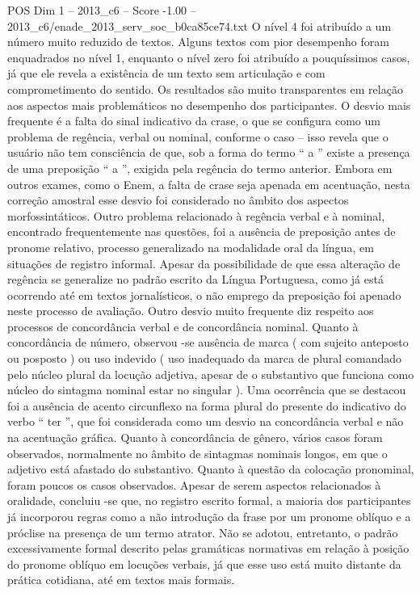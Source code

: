 \begin{textsample}{POS Dim 1 – 2013\_c6 – Score -1.00 – 2013\_c6/enade\_2013\_serv\_soc\_b0ca85ce74.txt}
O nível 4 foi atribuído a um número muito reduzido de textos.
Alguns textos com pior desempenho foram enquadrados no nível 1, enquanto o nível zero foi atribuído a pouquíssimos casos, já que ele revela a existência de um texto sem articulação e com comprometimento do sentido.
Os resultados são muito transparentes em relação aos aspectos mais problemáticos no desempenho dos participantes.
O desvio mais frequente é a falta do sinal indicativo da crase, o que se configura como um problema de regência, verbal ou nominal, conforme o caso – isso revela que o usuário não tem consciência de que, sob a forma do termo “ a ” existe a presença de uma preposição “ a ”, exigida pela regência do termo anterior.
Embora em outros exames, como o Enem, a falta de crase seja apenada em acentuação, nesta correção amostral esse desvio foi considerado no âmbito dos aspectos morfossintáticos.
Outro problema relacionado à regência verbal e à nominal, encontrado frequentemente nas questões, foi a ausência de preposição antes de pronome relativo, processo generalizado na modalidade oral da língua, em situações de registro informal.
Apesar da possibilidade de que essa alteração de regência se generalize no padrão escrito da Língua Portuguesa, como já está ocorrendo até em textos jornalísticos, o não emprego da preposição foi apenado neste processo de avaliação.
Outro desvio muito frequente diz respeito aos processos de concordância verbal e de concordância nominal.
Quanto à concordância de número, observou -se ausência de marca ( com sujeito anteposto ou posposto ) ou uso indevido ( uso inadequado da marca de plural comandado pelo núcleo plural da locução adjetiva, apesar de o substantivo que funciona como núcleo do sintagma nominal estar no singular ).
Uma ocorrência que se destacou foi a ausência de acento circunflexo na forma plural do presente do indicativo do verbo “ ter ”, que foi considerada como um desvio na concordância verbal e não na acentuação gráfica.
Quanto à concordância de gênero, vários casos foram observados, normalmente no âmbito de sintagmas nominais longos, em que o adjetivo está afastado do substantivo.
Quanto à questão da colocação pronominal, foram poucos os casos observados.
Apesar de serem aspectos relacionados à oralidade, concluiu -se que, no registro escrito formal, a maioria dos participantes já incorporou regras como a não introdução da frase por um pronome oblíquo e a próclise na presença de um termo atrator.
Não se adotou, entretanto, o padrão excessivamente formal descrito pelas gramáticas normativas em relação à posição do pronome oblíquo em locuções verbais, já que esse uso está muito distante da prática cotidiana, até em textos mais formais.

\end{textsample}
